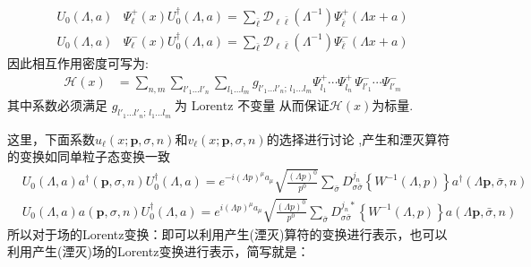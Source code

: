 \begin{enumerate}
        \begin{subequations}
                   \begin{align}
                     U_0(\Lambda,a)&\Psi^{+}_\ell(x)U_0^\dagger(\Lambda,a)=\sum_{\bar{\ell}}\mathscr{D}_{\ell\bar{\ell}}(\Lambda^{-1})\Psi_{\bar{\ell}}^+(\Lambda x+a)\\
                    U_0(\Lambda,a)&\Psi^{-}_\ell(x)U_0^\dagger(\Lambda,a)=\sum_{\bar{\ell}}\mathscr{D}_{\ell\bar{\ell}}(\Lambda^{-1})\Psi_{\bar{\ell}}^-(\Lambda x+a)
                   \end{align}
            \end{subequations}
    因此相互作用密度可写为:
        \begin{equation}
                \begin{aligned}
                    \mathscr{H}(x)
                    &=
                    \sum_{n,m}
                    \sum_{l'_1\ldots l'_n}
                    \sum_{l_1\ldots l_m}
                    g_{l'_1\ldots l'_n;\,l_1\ldots l_m}
                    \Psi^+_{l_1}\cdots
                    \Psi^+_{l_n}
                    \,
                    \Psi^-_{l'_1}\cdots
                    \Psi^-_{l'_m}
                \end{aligned}
        \end{equation}
    其中系数必须满足
            $g_{l'_1\ldots l'_n;\,l_1\ldots l_m}
            \ \text{为 Lorentz 不变量}$
    从而保证$ \mathscr{H}(x)$为标量.
\end{enumerate}
\color{blue}这里，下面系数$u_\ell(x;\boldsymbol{p},\sigma,n)$和$v_\ell(x;\boldsymbol{p},\sigma,n)$的选择进行讨论\normalcolor 
,产生和湮灭算符的变换如同单粒子态变换一致
\begin{subequations}
    \begin{align}
                &U_0(\Lambda,a)a^\dagger(\boldsymbol{p},\sigma,n)U_0^\dagger(\Lambda,a)=e^{-i(\Lambda p)^\mu a_\mu}\sqrt{\frac{(\Lambda p)^0}{p^0}}\sum_{\bar{\sigma}}D_{\sigma \bar{\sigma}}^{j_n}\left\{W^{-1}(\Lambda,p)\right\}a^\dagger(\Lambda\boldsymbol{p},\bar{\sigma},n)\\
                &U_0(\Lambda,a)a(\boldsymbol{p},\sigma,n)U_0^\dagger(\Lambda,a)=e^{i(\Lambda p)^\mu a_\mu}\sqrt{\frac{(\Lambda p)^0}{p^0}}\sum_{\bar{\sigma}}D_{\sigma \bar{\sigma}}^{j_n*}\left\{W^{-1}(\Lambda,p)\right\}a(\Lambda\boldsymbol{p},\bar{\sigma},n)
    \end{align}
\end{subequations}
所以对于场的Lorentz变换：即可以利用产生(湮灭)算符的变换进行表示，也可以利用产生(湮灭)场的Lorentz变换进行表示，简写就是：
